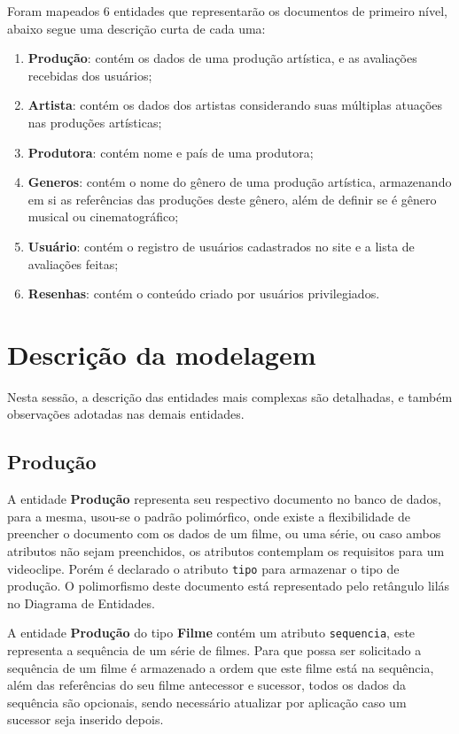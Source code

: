 \documentclass[
	12pt,				%
	openright,			%
	oneside,			%
	a4paper,			%
	english,			%
	french,				%
	spanish,			%
	brazil,				%
	]{abntex2}
\begin{document}
Foram mapeados 6 entidades que representarão os documentos de primeiro nível, abaixo segue uma descrição curta de cada uma:

\begin{enumerate}
	\item \textbf{Produção}: contém os dados de uma produção artística, e as avaliações recebidas dos usuários;
	\item \textbf{Artista}: contém os dados dos artistas considerando suas múltiplas atuações nas produções artísticas;
	\item \textbf{Produtora}: contém nome e país de uma produtora;
	\item \textbf{Generos}: contém o nome do gênero de uma produção artística, armazenando em si as referências das produções deste gênero, além de definir se é gênero musical ou cinematográfico; 
	\item \textbf{Usuário}: contém o registro de usuários cadastrados no site e a lista de avaliações feitas;
	\item \textbf{Resenhas}: contém o conteúdo criado por usuários privilegiados.
\end{enumerate}

\section[Descrição]{Descrição da modelagem}

Nesta sessão, a descrição das entidades mais complexas são detalhadas, e também observações adotadas nas demais entidades.

\subsection{Produção}
A entidade \textbf{Produção} representa seu respectivo documento no banco de dados, para a mesma, usou-se o padrão polimórfico, onde existe a flexibilidade de preencher o documento com os dados de um filme, ou uma série, ou caso ambos atributos não sejam preenchidos, os atributos contemplam os requisitos para um videoclipe. Porém é declarado o atributo \verb+tipo+ para armazenar o tipo de produção. O polimorfismo deste documento está representado pelo retângulo lilás no Diagrama de Entidades.

A entidade \textbf{Produção} do tipo \textbf{Filme} contém um atributo \verb+sequencia+, este representa a sequência de um série de filmes. Para que possa ser solicitado a sequência de um filme é armazenado a ordem que este filme está na sequência, além das referências do seu filme antecessor e sucessor, todos os dados da sequência são opcionais, sendo necessário atualizar por aplicação caso um sucessor seja inserido depois.
\end{document}
